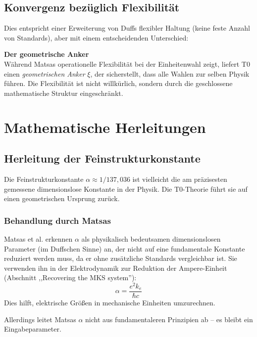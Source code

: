 	\subsection{Konvergenz bezüglich Flexibilität}
	
	Dies entspricht einer Erweiterung von Duffs flexibler Haltung (keine feste Anzahl von Standards), aber mit einem entscheidenden Unterschied:
	
	\begin{insight}
		\textbf{Der geometrische Anker}\\
		Während Matsas operationelle Flexibilität bei der Einheitenwahl zeigt, liefert T0 einen \emph{geometrischen Anker} $\xi$, der sicherstellt, dass alle Wahlen zur selben Physik führen. Die Flexibilität ist nicht willkürlich, sondern durch die geschlossene mathematische Struktur eingeschränkt.
	\end{insight}
	
	\section{Mathematische Herleitungen}
	
	\subsection{Herleitung der Feinstrukturkonstante}\label{sec:alpha_derivation}
	
	Die Feinstrukturkonstante $\alpha \approx 1/137{,}036$ ist vielleicht die am präzisesten gemessene dimensionslose Konstante in der Physik. Die T0-Theorie führt sie auf einen geometrischen Ursprung zurück.
	
	\subsubsection{Behandlung durch Matsas}
	
	Matsas et al. erkennen $\alpha$ als physikalisch bedeutsamen dimensionslosen Parameter (im Duffschen Sinne) an, der nicht auf eine fundamentale Konstante reduziert werden muss, da er ohne zusätzliche Standards vergleichbar ist. Sie verwenden ihn in der Elektrodynamik zur Reduktion der Ampere-Einheit (Abschnitt ,,Recovering the MKS system''):
	\[
	\alpha = \frac{e^2 k_e}{\hbar c}
	\]
	Dies hilft, elektrische Größen in mechanische Einheiten umzurechnen.
	
	Allerdings leitet Matsas $\alpha$ nicht aus fundamentaleren Prinzipien ab -- es bleibt ein Eingabeparameter.
	
